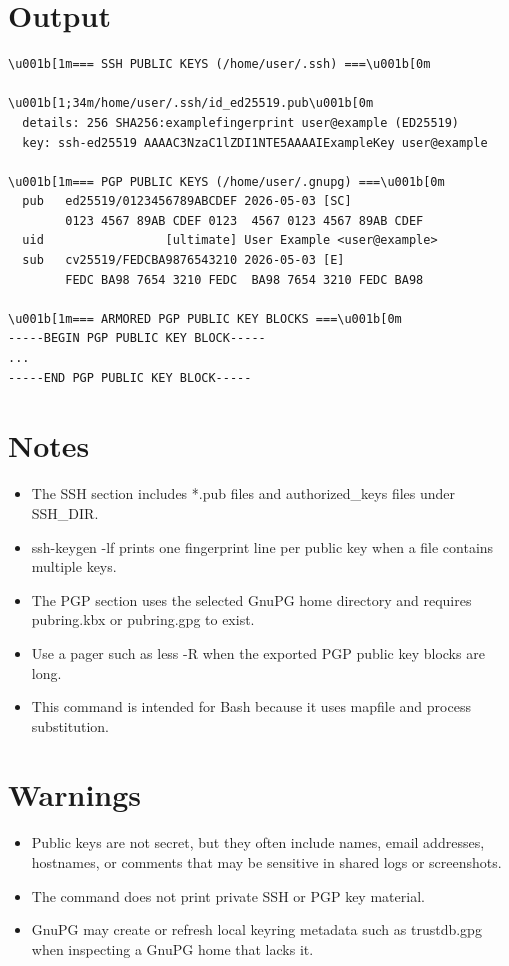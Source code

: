 \documentclass{article}
\begin{document}
\section*{Output}
\begin{lstlisting}
\u001b[1m=== SSH PUBLIC KEYS (/home/user/.ssh) ===\u001b[0m

\u001b[1;34m/home/user/.ssh/id_ed25519.pub\u001b[0m
  details: 256 SHA256:examplefingerprint user@example (ED25519)
  key: ssh-ed25519 AAAAC3NzaC1lZDI1NTE5AAAAIExampleKey user@example

\u001b[1m=== PGP PUBLIC KEYS (/home/user/.gnupg) ===\u001b[0m
  pub   ed25519/0123456789ABCDEF 2026-05-03 [SC]
        0123 4567 89AB CDEF 0123  4567 0123 4567 89AB CDEF
  uid                 [ultimate] User Example <user@example>
  sub   cv25519/FEDCBA9876543210 2026-05-03 [E]
        FEDC BA98 7654 3210 FEDC  BA98 7654 3210 FEDC BA98

\u001b[1m=== ARMORED PGP PUBLIC KEY BLOCKS ===\u001b[0m
-----BEGIN PGP PUBLIC KEY BLOCK-----
...
-----END PGP PUBLIC KEY BLOCK-----
\end{lstlisting}

\section*{Notes}
\begin{itemize}
  \item The SSH section includes *.pub files and authorized\_keys files under SSH\_DIR.
  \item ssh-keygen -lf prints one fingerprint line per public key when a file contains multiple keys.
  \item The PGP section uses the selected GnuPG home directory and requires pubring.kbx or pubring.gpg to exist.
  \item Use a pager such as less -R when the exported PGP public key blocks are long.
  \item This command is intended for Bash because it uses mapfile and process substitution.
\end{itemize}

\section*{Warnings}
\begin{itemize}
  \item Public keys are not secret, but they often include names, email addresses, hostnames, or comments that may be sensitive in shared logs or screenshots.
  \item The command does not print private SSH or PGP key material.
  \item GnuPG may create or refresh local keyring metadata such as trustdb.gpg when inspecting a GnuPG home that lacks it.
\end{itemize}
\end{document}
